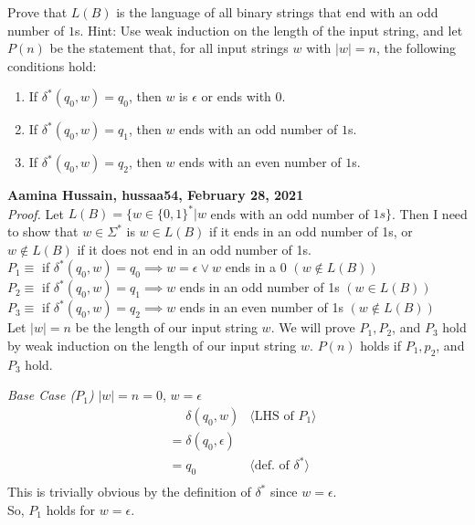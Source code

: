 \documentclass[11pt,fleqn]{article}
\newcommand{\be}{\begin{enumerate}}
\newcommand{\ee}{\end{enumerate}}
\newcommand{\pnote}[1]{\langle \mbox{#1} \rangle}
\begin{document}
   Prove that $L(B)$ is the language of all binary strings that end
   with an odd number of $1$s.  Hint: Use weak induction on the length
   of the input string, and let $P(n)$ be the statement that, for all
   input strings $w$ with $|w| = n$, the following conditions hold:

   \be

     \item If $\delta^*(q_0,w) = q_0$, then $w$ is $\epsilon$ or ends
       with $0$.

     \item If $\delta^*(q_0,w) = q_1$, then $w$ ends with an odd
       number of $1$s.

     \item If $\delta^*(q_0,w) = q_2$, then $w$ ends
       with an even number of $1$s.

   \ee
	
   \textbf{Aamina Hussain, hussaa54, February 28, 2021}\\
   \emph{Proof.} Let $L(B) = \{w \in \{0, 1\}^* | w$ ends with an odd number of $1s\}$. Then I need to show that $w \in \Sigma^*$ is $w \in L(B)$ if it ends in an odd number of 1s, or $w \notin L(B)$ if it does not end in an odd number of 1s.\\
   
   $P_1 \equiv$ if $\delta^*(q_0, w) = q_0 \implies w = \epsilon \lor w$ ends in a 0 $(w \notin L(B))$\\
   $P_2 \equiv$ if $\delta^*(q_0, w) = q_1 \implies w$ ends in an odd number of 1s $(w \in L(B))$\\
   $P_3 \equiv$ if $\delta^*(q_0, w) = q_2 \implies w$ ends in an even number of 1s $(w \notin L(B))$\\

   Let $|w| = n$ be the length of our input string $w$. We will prove $P_1, P_2$, and $P_3$ hold by weak induction on the length of our input string $w$. $P(n)$ holds if $P_1, p_2$, and $P_3$ hold.

    \emph{Base Case ($P_1$)} $|w| = n = 0$, $w = \epsilon$
    \begin{align*}
      &\phantom{{}=} \delta(q_0, w) & \pnote{LHS of $P_1$}\\
      &= \delta(q_0, \epsilon) \\
      &= q_0       & \pnote{def. of $\delta^*$}\\
    \end{align*}
    This is trivially obvious by the definition of $\delta^*$ since $w = \epsilon$.\\
    So, $P_1$ holds for $w = \epsilon$.
\end{document}
